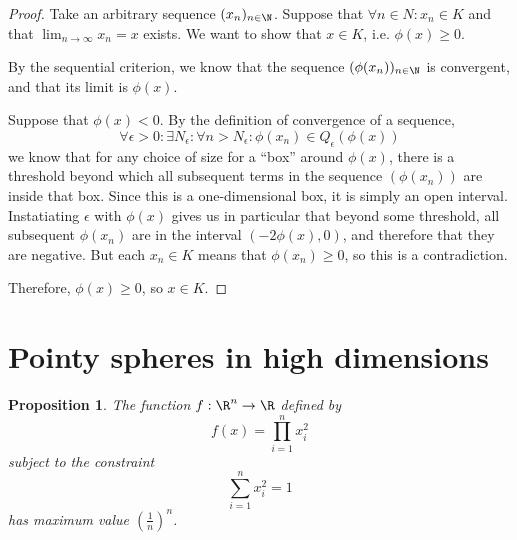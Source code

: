 \documentclass[letterpaper,11pt]{article}
\newtheorem{prop}{Proposition}
\newcommand{\parens}[1]{\left(#1\right)}
\begin{document}
\begin{proof}
  Take an arbitrary sequence $(x_n)_{n\in\N}$. Suppose that
  $\forall n \in N : x_n \in K$ and that $\lim_{n\to\infty} x_n = x$ exists.
  We want to show that $x \in K$, i.e. $\phi(x) \geq 0$.

  By the sequential criterion, we know that the sequence $(\phi(x_n))_{n\in\N}$
  is convergent, and that its limit is $\phi(x)$.

  Suppose that $\phi(x) < 0$. By the definition of convergence of a sequence,
  \begin{equation*}
    \forall \epsilon > 0 : \exists N_\epsilon : \forall n > N_\epsilon :
    \phi(x_n) \in Q_\epsilon(\phi(x))
  \end{equation*}
  we know that for any choice of size for a ``box'' around $\phi(x)$, there is
  a threshold beyond which all subsequent terms in the sequence $(\phi(x_n))$
  are inside that box. Since this is a one-dimensional box, it is simply an
  open interval. Instatiating $\epsilon$ with $\phi(x)$ gives us in particular
  that beyond some threshold, all subsequent $\phi(x_n)$ are in the interval
  $(-2\phi(x), 0)$, and therefore that they are negative. But each $x_n \in K$
  means that $\phi(x_n) \geq 0$, so this is a contradiction.

  Therefore, $\phi(x) \geq 0$, so $x \in K$.
\end{proof}

\section{Pointy spheres in high dimensions}

\begin{prop}
  The function $f : \R^n \to \R$ defined by
  \begin{equation*}
    f(x) = \prod_{i=1}^n x_i^2
  \end{equation*}
  subject to the constraint
  \begin{equation*}
    \sum_{i=1}^n x_i^2 = 1
  \end{equation*}
  has maximum value $\parens{\frac{1}{n}}^n$.
\end{prop}
\end{document}
